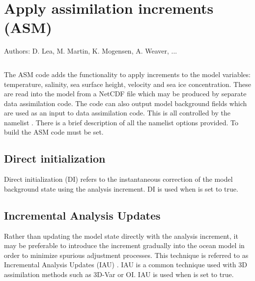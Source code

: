 \chapter{Apply assimilation increments (ASM)}
\label{ASM}

Authors: D. Lea,  M. Martin, K. Mogensen, A. Weaver, ...   %

\minitoc


\newpage
$\ $\newline    %

The ASM code adds the functionality to apply increments to the model variables: 
temperature, salinity, sea surface height, velocity and sea ice concentration. 
These are read into the model from a NetCDF file which may be produced by separate data
assimilation code.  The code can also output model background fields which are used
as an input to data assimilation code. This is all controlled by the namelist
\textit{ }.  There is a brief description of all the namelist options
provided.  To build the ASM code  must be set.


\section{Direct initialization}
\label{ASM_DI}

Direct initialization (DI) refers to the instantaneous correction
of the model background state using the analysis increment.
DI is used when  is set to true.

\section{Incremental Analysis Updates}
\label{ASM_IAU}

Rather than updating the model state directly with the analysis increment,
it may be preferable to introduce the increment gradually into the ocean
model in order to minimize spurious adjustment processes. This technique
is referred to as Incremental Analysis Updates (IAU) \citep{Bloom_al_MWR96}.
IAU is a common technique used with 3D assimilation methods such as 3D-Var or OI.
IAU is used when  is set to true.


